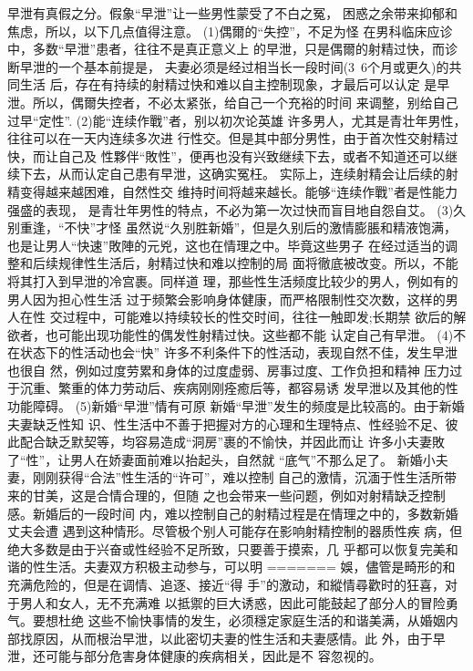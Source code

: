 \documentclass[12pt,UTF8]{ctexbook}
\begin{document}
早泄有真假之分。假象“早泄”让一些男性蒙受了不白之冤，
困惑之余带来抑郁和焦虑，所以，以下几点值得注意。
(1)偶爾的“失控”，不足为怪
在男科临床应诊中，多数“早泄”患者，往往不是真正意义上
的早泄，只是偶爾的射精过快，而诊断早泄的一个基本前提是，
夫妻必须是经过相当长一段时间(3~6个月或更久)的共同生活
后，存在有持续的射精过快和难以自主控制现象，才最后可以认定
是早泄。所以，偶爾失控者，不必太紧张，给自己一个充裕的时间
来调整，别给自己过早“定性”.
(2)能“连续作戰”者，别以初次论英雄
许多男人，尤其是青壮年男性，往往可以在一天内连续多次进
行性交。但是其中部分男性，由于首次性交射精过快，而让自己及
性夥伴“敗性”，便再也没有兴致继续下去，或者不知道还可以继
续下去，从而认定自己患有早泄，这确实冤枉。
实际上，连续射精会让后续的射精变得越来越困难，自然性交
维持时间将越来越长。能够“连续作戰”者是性能力强盛的表现，
是青壮年男性的特点，不必为第一次过快而盲目地自怨自艾。
(3)久别重逢，“不快”才怪
虽然说“久别胜新婚”，但是久别后的激情膨脹和精液饱满，
也是让男人“快速”敗陣的元兇，这也在情理之中。毕竟这些男子
在经过适当的调整和后续规律性生活后，射精过快和难以控制的局
面将徹底被改变。所以，不能将其打入到早泄的冷宫裹。同样道
理，那些性生活频度比较少的男人，例如有的男人因为担心性生活
过于频繁会影响身体健康，而严格限制性交次数，这样的男人在性
交过程中，可能难以持续较长的性交时间，往往一触即发;长期禁
欲后的解欲者，也可能出现功能性的偶发性射精过快。这些都不能
认定自己有早泄。
(4)不在状态下的性活动也会“快”
许多不利条件下的性活动，表现自然不佳，发生早泄也很自
然，例如过度劳累和身体的过度虚弱、房事过度、工作负担和精神
压力过于沉重、繁重的体力劳动后、疾病刚刚痊癒后等，都容易诱
发早泄以及其他的性功能障碍。
(5)新婚“早泄”情有可原
新婚“早泄”发生的频度是比较高的。由于新婚夫妻缺乏性知
识、性生活中不善于把握对方的心理和生理特点、性经验不足、彼
此配合缺乏默契等，均容易造成“洞房”裹的不愉快，并因此而让
许多小夫妻敗了“性”，让男人在娇妻面前难以抬起头，自然就
“底气”不那么足了。
新婚小夫妻，刚刚获得“合法”性生活的“许可”，难以控制
自己的激情，沉湎于性生活所带来的甘美，这是合情合理的，但随
之也会带来一些问题，例如对射精缺乏控制感。新婚后的一段时间
内，难以控制自己的射精过程是在情理之中的，多数新婚丈夫会遭
遇到这种情形。尽管极个别人可能存在影响射精控制的器质性疾
病，但绝大多数是由于兴奋或性经验不足所致，只要善于摸索，几
乎都可以恢复完美和谐的性生活。夫妻双方积极主动参与，可以明
=======
娛，儘管是畸形的和充满危险的，但是在调情、追逐、接近“得
手”的激动，和縱情尋歡时的狂喜，对于男人和女人，无不充满难
以抵禦的巨大诱惑，因此可能鼓起了部分人的冒险勇气。要想杜绝
这些不愉快事情的发生，必须穩定家庭生活的和谐美满，从婚姻内
部找原因，从而根治早泄，以此密切夫妻的性生活和夫妻感情。此
外，由于早泄，还可能与部分危害身体健康的疾病相关，因此是不
容忽视的。
\end{document}
